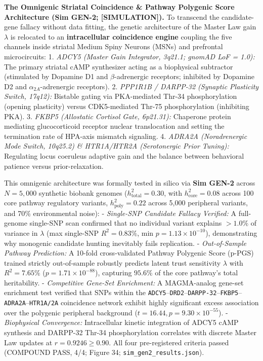 \documentclass[
]{article}
\begin{document}
\textbf{The Omnigenic Striatal Coincidence \& Pathway Polygenic Score
Architecture (Sim GEN-2; {[}SIMULATION{]}).} To transcend the
candidate-gene fallacy without data fitting, the genetic architecture of
the Master Law gain \(\lambda\) is relocated to an \textbf{intracellular
coincidence engine} coupling the five channels inside striatal Medium
Spiny Neurons (MSNs) and prefrontal microcircuits: 1. \emph{ADCY5
(Master Gain Integrator, 3q21.1; gnomAD LoF = 1.0):} The primary
striatal cAMP synthesizer acting as a biophysical subtractor (stimulated
by Dopamine D1 and \(\beta\)-adrenergic receptors; inhibited by Dopamine
D2 and \(\alpha_{2A}\)-adrenergic receptors). 2. \emph{PPP1R1B /
DARPP-32 (Synaptic Plasticity Switch, 17q12):} Bistable gating via
PKA-mediated Thr-34 phosphorylation (opening plasticity) versus
CDK5-mediated Thr-75 phosphorylation (inhibiting PKA). 3. \emph{FKBP5
(Allostatic Cortisol Gate, 6p21.31):} Chaperone protein mediating
glucocorticoid receptor nuclear translocation and setting the
termination rate of HPA-axis mismatch signaling. 4. \emph{ADRA2A
(Noradrenergic Mode Switch, 10q25.2) \& HTR1A/HTR2A (Serotonergic Prior
Tuning):} Regulating locus coeruleus adaptive gain and the balance
between behavioral patience versus prior-relaxation.

This omnigenic architecture was formally tested in silico via
\textbf{Sim GEN-2} across \(N = 5,000\) synthetic biobank genomes
(\(h^2_{\mathrm{total}} = 0.30\), with \(h^2_{\mathrm{core}} = 0.08\)
across 100 core pathway regulatory variants,
\(h^2_{\mathrm{poly}} = 0.22\) across 5,000 peripheral variants, and
70\% environmental noise): - \emph{Single-SNP Candidate Fallacy
Verified:} A full-genome single-SNP scan confirmed that no individual
variant explains \(> 1.0\%\) of variance in \(\lambda\) (max single-SNP
\(R^2 = 0.83\%\), min \(p = 1.13 \times 10^{-10}\)), demonstrating why
monogenic candidate hunting inevitably fails replication. -
\emph{Out-of-Sample Pathway Prediction:} A 10-fold cross-validated
Pathway Polygenic Score (p-PGS) trained strictly out-of-sample robustly
predicts latent trust sensitivity \(\lambda\) with
\textbf{\(R^2 = 7.65\%\)} (\(p = 1.71 \times 10^{-88}\)), capturing
\(95.6\%\) of the core pathway's total heritability. - \emph{Competitive
Gene-Set Enrichment:} A MAGMA-analog gene-set enrichment test verified
that SNPs within the
\texttt{ADCY5}--\texttt{DRD2}--\texttt{DARPP-32}--\texttt{FKBP5}--\texttt{ADRA2A}--\texttt{HTR1A/2A}
coincidence network exhibit highly significant excess association over
the polygenic peripheral background
(\(t = 16.44, p = 9.30 \times 10^{-55}\)). - \emph{Biophysical
Convergence:} Intracellular kinetic integration of ADCY5 cAMP synthesis
and DARPP-32 Thr-34 phosphorylation correlates with discrete Master Law
updates at \(r = 0.9246 \ge 0.90\). All four pre-registered criteria
passed (COMPOUND PASS, 4/4; Figure 34;
\texttt{sim\_gen2\_results.json}).
\end{document}
